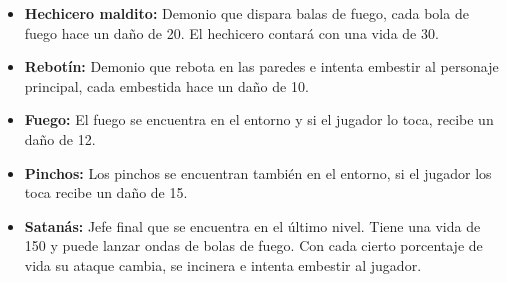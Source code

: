 \documentclass{article}
\begin{document}
\begin{itemize}
\item{\textbf{Hechicero maldito:} }   Demonio que dispara balas de fuego, cada bola de fuego hace un daño de 20. El hechicero contará con una vida de 30.
\end{itemize} 
\begin{itemize}
    \item {\textbf{Rebotín:}} Demonio que rebota en las paredes e intenta embestir al personaje principal, cada embestida hace un daño de 10. 
\end{itemize}
\begin{itemize}
    \item {\textbf{Fuego:}} El fuego se encuentra en el entorno y si el jugador lo toca, recibe un daño de 12.
\end{itemize}
\begin{itemize}
    \item {\textbf{Pinchos:}} Los pinchos se encuentran también en el entorno, si el jugador los toca recibe un daño de 15.
\end{itemize}
\begin{itemize}
    \item {\textbf{Satanás:}} Jefe final que se encuentra en el último nivel. Tiene una vida de 150 y puede lanzar ondas de bolas de fuego. Con cada cierto porcentaje de vida su ataque cambia, se incinera e intenta embestir al jugador.
\end{itemize}
\newpage
\end{document}
